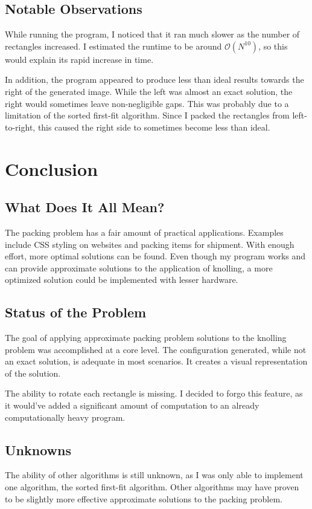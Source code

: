 \documentclass[10pt,titlepage,letterpaper]{article}
\begin{document}
	\subsection{Notable Observations}
	While running the program, I noticed that it ran much slower as the number of rectangles increased. I estimated the runtime to be around $\mathcal{O}(N^{10})$, so this would explain its rapid increase in time.\par
	In addition, the program appeared to produce less than ideal results towards the right of the generated image. While the left was almost an exact solution, the right would sometimes leave non-negligible gaps. This was probably due to a limitation of the sorted first-fit algorithm. Since I packed the rectangles from left-to-right, this caused the right side to sometimes become less than ideal.

	\section{Conclusion}
	\subsection{What Does It All Mean?}
	The packing problem has a fair amount of practical applications. Examples include CSS styling on websites and packing items for shipment. With enough effort, more optimal solutions can be found. Even though my program works and can provide approximate solutions to the application of knolling, a more optimized solution could be implemented with lesser hardware.
	\subsection{Status of the Problem}
	The goal of applying approximate packing problem solutions to the knolling problem was accomplished at a core level. The configuration generated, while not an exact solution, is adequate in most scenarios. It creates a visual representation of the solution.\par
	The ability to rotate each rectangle is missing. I decided to forgo this feature, as it would've added a significant amount of computation to an already computationally heavy program.
	\subsection{Unknowns}
	The ability of other algorithms is still unknown, as I was only able to implement one algorithm, the sorted first-fit algorithm. Other algorithms may have proven to be slightly more effective approximate solutions to the packing problem.
\end{document}

